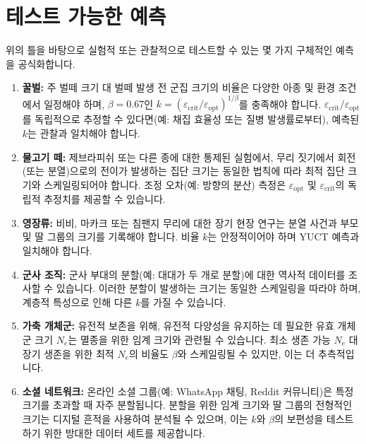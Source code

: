 \documentclass[12pt]{article}
\theoremstyle{remark}
\begin{document}
	\section{테스트 가능한 예측}
	\label{sec:predictions}
	
	위의 틀을 바탕으로 실험적 또는 관찰적으로 테스트할 수 있는 몇 가지 구체적인 예측을 공식화합니다.
	
	\begin{enumerate}
		\item \textbf{꿀벌:} 주 벌떼 크기 대 벌떼 발생 전 군집 크기의 비율은 다양한 아종 및 환경 조건에서 일정해야 하며, \(\beta = 0.67\)인 \(k = (\varepsilon_{\text{crit}}/\varepsilon_{\text{opt}})^{1/\beta}\)를 충족해야 합니다. \(\varepsilon_{\text{crit}}/\varepsilon_{\text{opt}}\)를 독립적으로 추정할 수 있다면(예: 채집 효율성 또는 질병 발생률로부터), 예측된 \(k\)는 관찰과 일치해야 합니다.
		
		\item \textbf{물고기 떼:} 제브라피쉬 또는 다른 종에 대한 통제된 실험에서, 무리 짓기에서 회전(또는 분열)으로의 전이가 발생하는 집단 크기는 동일한 법칙에 따라 최적 집단 크기와 스케일링되어야 합니다. 조정 오차(예: 방향의 분산) 측정은 \(\varepsilon_{\text{opt}}\) 및 \(\varepsilon_{\text{crit}}\)의 독립적 추정치를 제공할 수 있습니다.
		
		\item \textbf{영장류:} 비비, 마카크 또는 침팬지 무리에 대한 장기 현장 연구는 분열 사건과 부모 및 딸 그룹의 크기를 기록해야 합니다. 비율 \(k\)는 안정적이어야 하며 YUCT 예측과 일치해야 합니다.
		
		\item \textbf{군사 조직:} 군사 부대의 분할(예: 대대가 두 개로 분할)에 대한 역사적 데이터를 조사할 수 있습니다. 이러한 분할이 발생하는 크기는 동일한 스케일링을 따라야 하며, 계층적 특성으로 인해 다른 \(k\)를 가질 수 있습니다.
		
		\item \textbf{가축 개체군:} 유전적 보존을 위해, 유전적 다양성을 유지하는 데 필요한 유효 개체군 크기 \(N_e\)는 멸종을 위한 임계 크기와 관련될 수 있습니다. 최소 생존 가능 \(N_e\) 대 장기 생존을 위한 최적 \(N_e\)의 비율도 \(\beta\)와 스케일링될 수 있지만, 이는 더 추측적입니다.
		
		\item \textbf{소셜 네트워크:} 온라인 소셜 그룹(예: WhatsApp 채팅, Reddit 커뮤니티)은 특정 크기를 초과할 때 자주 분할됩니다. 분할을 위한 임계 크기와 딸 그룹의 전형적인 크기는 디지털 흔적을 사용하여 분석될 수 있으며, 이는 \(k\)와 \(\beta\)의 보편성을 테스트하기 위한 방대한 데이터 세트를 제공합니다.
	\end{enumerate}
	
\end{document}
